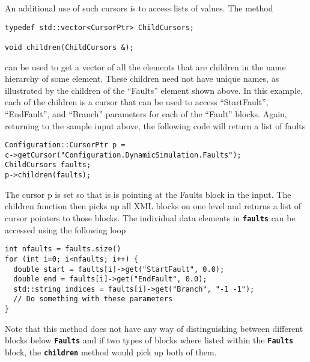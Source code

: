 An additional use of such cursors is to access lists of values. The method 

{
\color{red}
\begin{Verbatim}[fontseries=b]
typedef std::vector<CursorPtr> ChildCursors;

void children(ChildCursors &);
\end{Verbatim}
}

can be used to get a vector of all the elements that are children in the name hierarchy of some element. These children need not have unique names, as illustrated by the children of the ``Faults'' element shown above. In this example, each of the children is a cursor that can be used to access ``StartFault'', ``EndFault'', and ``Branch'' parameters for each of the ``Fault'' blocks. Again, returning to the sample input above, the following code will return a list of faults

{
\color{red}
\begin{Verbatim}[fontseries=b]
Configuration::CursorPtr p = 
c->getCursor("Configuration.DynamicSimulation.Faults");
ChildCursors faults;
p->children(faults);
\end{Verbatim}
}

The cursor p is set so that is is pointing at the Faults block in the input. The children function then picks up all XML blocks on one level and returns a list of cursor pointers to those blocks. The individual data elements in \texttt{\textbf{faults}} can be accessed using the following loop

{
\color{red}
\begin{Verbatim}[fontseries=b]
int nfaults = faults.size()
for (int i=0; i<nfaults; i++) {
  double start = faults[i]->get("StartFault", 0.0);
  double end = faults[i]->get("EndFault", 0.0);
  std::string indices = faults[i]->get("Branch", "-1 -1");
  // Do something with these parameters
}
\end{Verbatim}
}

Note that this method does not have any way of distinguishing between different blocks below \texttt{\textbf{Faults}} and if two types of blocks where listed within the \texttt{\textbf{Faults}} block, the \texttt{\textbf{children}} method would pick up both of them.
